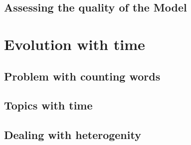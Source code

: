 \documentclass[a4paper,11pt]{article}
\begin{document}
\subsection*{Assessing the quality of the Model}


\section{Evolution with time}

\subsection*{Problem with counting words}



\subsection*{Topics with time}

\subsection*{Dealing with heterogenity}
\end{document}

